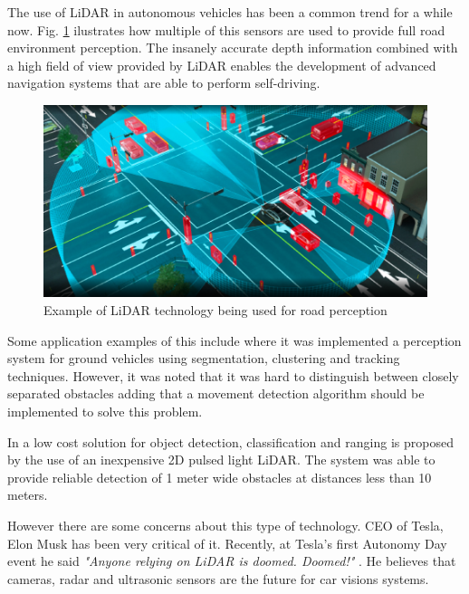 The use of \ac{LiDAR} in autonomous vehicles has been a common trend for a while now. Fig. \ref{fig:lidarcar} ilustrates how multiple of this sensors are used to provide full road environment perception. The insanely accurate depth information combined with a high field of view provided by \ac{LiDAR} enables the development of advanced navigation systems that are able to perform self-driving.
 
 
\begin{figure}[h] 
\centerline{\includegraphics [width=0.7 \textwidth]{imgs/chapter2/lidarcar.png}}
\caption{Example of \ac{LiDAR} technology being used for road perception \cite{lidarcar}}
\label{fig:lidarcar}
\end{figure}

Some application examples of this include \cite{lidarperception}  where it was implemented a perception system for ground vehicles using segmentation, clustering and tracking techniques.  However, it was noted that it was hard to distinguish between closely separated obstacles adding that a movement detection algorithm should be implemented to solve this problem. 


In \cite{car2dlidar} a low cost solution for object detection, classification and ranging is  proposed by the use of an inexpensive 2D pulsed light \ac{LiDAR}. The system was able to provide reliable detection of 1 meter wide obstacles at distances less than 10 meters.


However there are some concerns about this type of technology. CEO of Tesla, Elon Musk has been very critical of it. Recently, at Tesla’s first Autonomy Day event  he said \textit{"Anyone relying on \ac{LiDAR} is doomed. Doomed!"} \cite{elon}. He believes that cameras, radar and ultrasonic sensors are the future for car visions systems. 

